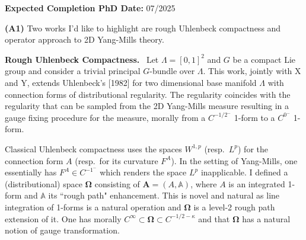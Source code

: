 \documentclass[./Research_statement.tex]{subfiles}
\newcommand{\bfOmega}{\boldsymbol{\Omega}}
\newcommand{\bA}{\mathbb A}
\newcommand{\bfA}{\mathbf{A}}
\begin{document}
\vspace*{-2cm}
\noindent \textbf{Expected Completion PhD Date:} 07/2025
\vspace{0.75cm}
\medskip 

\noindent \textbf{(A1)} Two works I’d like to highlight are rough Uhlenbeck compactness and operator approach to 2D Yang-Mills theory.

\vspace{2pt}

\noindent \textbf{Rough Uhlenbeck Compactness.}\ 
%
Let $\Lambda=[0,1]^2$ and $G$ be a compact Lie group and consider a trivial principal $G$-bundle over $\Lambda$.  
This work, jointly with X and Y, extends Uhlenbeck's [1982] for two dimensional base manifold $\Lambda$ with connection forms of distributional regularity. The regularity coincides with the regularity that can be sampled from the 2D Yang-Mills measure resulting in a gauge fixing procedure for the measure, morally from a $C^{-1/2^-}$ 1-form to a $C^{0^-}$ 1-form.  


Classical Uhlenbeck compactness uses the spaces $W^{1,p}$ (resp.\ $L^p$) for the connection form $A$ (resp.\ for its curvature $F^A$). In the setting of Yang-Mills, one essentially has $F^A\in C^{-1^-}$ which renders the space $L^p$ inapplicable. I defined a (distributional) space $\bfOmega$ consisting of $\bfA=(A,\bA)$, where $A$ is an integrated 1-form and  $\bA$ its ``rough path" enhancement. 
%
%
This is novel and natural as line integration of 1-forms is a natural operation and $\bfOmega$ is a level-2 rough path extension of it. 
%
One has morally $C^\infty\subset \bfOmega\subset C^{-1/2-\kappa}$ and that $\bfOmega$ has a natural notion of gauge transformation. 
\end{document}
